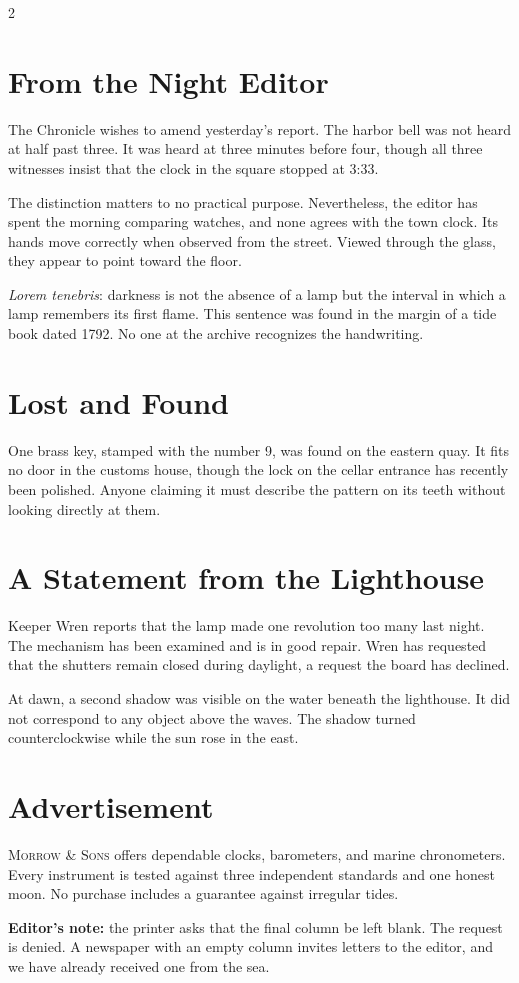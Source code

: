 \begin{multicols}{2}
\section*{From the Night Editor}
The Chronicle wishes to amend yesterday's report. The harbor bell was not
heard at half past three. It was heard at three minutes before four, though
all three witnesses insist that the clock in the square stopped at 3:33.

The distinction matters to no practical purpose. Nevertheless, the editor
has spent the morning comparing watches, and none agrees with the town clock.
Its hands move correctly when observed from the street. Viewed through the
glass, they appear to point toward the floor.

\textit{Lorem tenebris}: darkness is not the absence of a lamp but the
interval in which a lamp remembers its first flame. This sentence was found
in the margin of a tide book dated 1792. No one at the archive recognizes
the handwriting.

\section*{Lost and Found}
One brass key, stamped with the number 9, was found on the eastern quay. It
fits no door in the customs house, though the lock on the cellar entrance
has recently been polished. Anyone claiming it must describe the pattern
on its teeth without looking directly at them.

\columnbreak
\section*{A Statement from the Lighthouse}
Keeper Wren reports that the lamp made one revolution too many last night.
The mechanism has been examined and is in good repair. Wren has requested
that the shutters remain closed during daylight, a request the board has
declined.

At dawn, a second shadow was visible on the water beneath the lighthouse.
It did not correspond to any object above the waves. The shadow turned
counterclockwise while the sun rose in the east.

\section*{Advertisement}
\textsc{Morrow \& Sons} offers dependable clocks, barometers, and marine
chronometers. Every instrument is tested against three independent standards
and one honest moon. No purchase includes a guarantee against irregular tides.

\textbf{Editor's note:} the printer asks that the final column be left
blank. The request is denied. A newspaper with an empty column invites
letters to the editor, and we have already received one from the sea.
\end{multicols}
